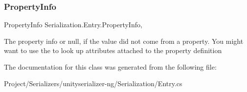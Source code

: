 \subsubsection{\texorpdfstring{Property\+Info}{PropertyInfo}}
{\footnotesize\ttfamily Property\+Info Serialization.\+Entry.\+Property\+Info\hspace{0.3cm}{\ttfamily [get]}, {\ttfamily [set]}}



The property info or null, if the value did not come from a property. You might want to use the to look up attributes attached to the property definition 



The documentation for this class was generated from the following file\+:\begin{DoxyCompactItemize}
\item 
Project/\+Serializers/unityserializer-\/ng/\+Serialization/Entry.\+cs\end{DoxyCompactItemize}
